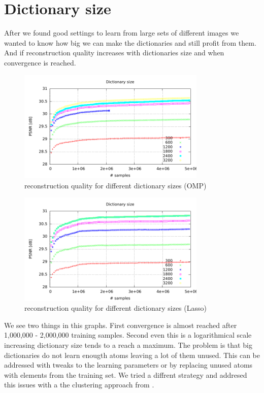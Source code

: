 \newpage
\section{Dictionary size}
After we found good settings to learn from large sets of different images we
wanted to know how big we can make the dictionaries and still profit from them.
And if reconstruction quality increases with dictionaries size and when
convergence is reached.

\begin{figure}[h]
\centering
\includegraphics[width = 0.8\textwidth]{../tests/results/dictSizeOMP.pdf}
\caption{reconstruction quality for different dictionary sizes (OMP)}
\label{fig:dictSizeOMP}
\end{figure}

\begin{figure}[h]
\centering
\includegraphics[width = 0.8\textwidth]{../tests/results/dictSizeLasso.pdf}
\caption{reconstruction quality for different dictionary sizes (Lasso)}
\label{fig:dict size}
\end{figure}

We see two things in this graphs. First convergence is almost reached
after 1,000,000 - 2,000,000 training samples. Second even this is a
logarithmical scale increasing dictionary size tends to a reach a maximum. The
problem is that big dictionaries do not learn enougth atoms leaving a lot of
them unused. This can be addressed with tweaks to the learning parameters or by
replacing unused atoms with elements from the training set. We tried a
diffrent strategy and addresed this issues with a the clustering approach from
.


